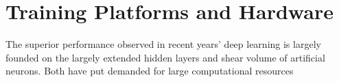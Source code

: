 \section{Training Platforms and Hardware}
The superior performance observed in recent years' deep learning is largely founded on the largely extended hidden layers and shear volume of artificial neurons. Both have put demanded for large computational resources